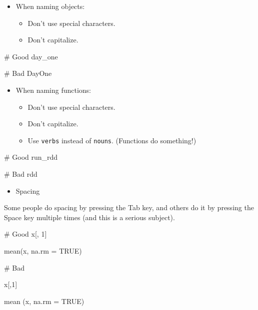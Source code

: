 \documentclass[
  letterpaper,
  DIV=11,
  numbers=noendperiod]{scrreprt}
\newenvironment{Shaded}{\begin{snugshade}}{\end{snugshade}}
\newcommand{\AttributeTok}[1]{\textcolor[rgb]{0.40,0.45,0.13}{#1}}
\newcommand{\CommentTok}[1]{\textcolor[rgb]{0.37,0.37,0.37}{#1}}
\newcommand{\ConstantTok}[1]{\textcolor[rgb]{0.56,0.35,0.01}{#1}}
\newcommand{\DecValTok}[1]{\textcolor[rgb]{0.68,0.00,0.00}{#1}}
\newcommand{\FunctionTok}[1]{\textcolor[rgb]{0.28,0.35,0.67}{#1}}
\newcommand{\NormalTok}[1]{\textcolor[rgb]{0.00,0.23,0.31}{#1}}
\providecommand{\tightlist}{%
  \setlength{\itemsep}{0pt}\setlength{\parskip}{0pt}}\usepackage{longtable,booktabs,array}
\begin{document}
\begin{itemize}
\tightlist
\item
  When naming objects:

  \begin{itemize}
  \tightlist
  \item
    Don't use special characters.
  \item
    Don't capitalize.
  \end{itemize}
\end{itemize}

\begin{Shaded}
\begin{Highlighting}[]
\CommentTok{\# Good }
\NormalTok{day\_one}
    
\CommentTok{\# Bad }
\NormalTok{DayOne}
\end{Highlighting}
\end{Shaded}

\begin{itemize}
\tightlist
\item
  When naming functions:

  \begin{itemize}
  \tightlist
  \item
    Don't use special characters.
  \item
    Don't capitalize.
  \item
    Use \texttt{verbs} instead of \texttt{nouns}. (Functions do
    something!)
  \end{itemize}
\end{itemize}

\begin{Shaded}
\begin{Highlighting}[]
\CommentTok{\# Good }
\NormalTok{run\_rdd }

\CommentTok{\# Bad }
\NormalTok{rdd}
\end{Highlighting}
\end{Shaded}

\begin{itemize}
\tightlist
\item
  Spacing
\end{itemize}

Some people do spacing by pressing the Tab key, and others do it by
pressing the Space key multiple times (and this is a serious subject).

\begin{Shaded}
\begin{Highlighting}[]
\CommentTok{\# Good}
\NormalTok{x[, }\DecValTok{1}\NormalTok{] }

\FunctionTok{mean}\NormalTok{(x, }\AttributeTok{na.rm =} \ConstantTok{TRUE}\NormalTok{) }

\CommentTok{\# Bad}

\NormalTok{x[,}\DecValTok{1}\NormalTok{]}

\FunctionTok{mean}\NormalTok{ (x, }\AttributeTok{na.rm =} \ConstantTok{TRUE}\NormalTok{)}
\end{Highlighting}
\end{Shaded}
\end{document}
